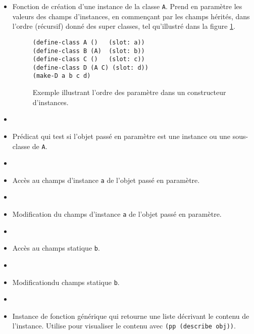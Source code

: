       \begin{itemize}
      \item[\texttt{(make-A a)}:] Fonction de création d'une instance
        de la classe \texttt{A}. Prend en paramètre les valeurs des
        champs d'instances, en commençant par les champs hérités, dans
        l'ordre (récursif) donné des super classes, tel qu'illustré
        dans la figure \ref{ex-make-instance}.
        \begin{figure}[h!]
          \begin{lstlisting}
(define-class A ()   (slot: a))
(define-class B (A)  (slot: b))
(define-class C ()   (slot: c))
(define-class D (A C) (slot: d))
(make-D a b c d)
          \end{lstlisting}
          \caption{Exemple illustrant l'ordre des paramètre dans un
            constructeur d'instances.}
          \label{ex-make-instance}
        \end{figure}
      \item[]

      \item[\texttt{(A? obj)}:] Prédicat qui test si l'objet passé en
        paramètre est une instance ou une sous-classe de \texttt{A}.
      \item[]

      \item[\texttt{(A-a obj)}:] Accès au champs d'instance \texttt{a}
        de l'objet passé en paramètre.
      \item[]

      \item[\texttt{(A-a-set! obj new-a)}:] Modification du champs
        d'instance \texttt{a} de l'objet passé en paramètre.
      \item[]

      \item[\texttt{(A-b)}:] Accès au champs statique \texttt{b}.
      \item[]

      \item[\texttt{(A-b-set! new-b)}:] Modificationdu champs
        statique \texttt{b}.
      \item[]

      \item[\texttt{(describe obj)}:] Instance de fonction générique
        qui retourne une liste décrivant le contenu de
        l'instance. Utilise pour visualiser le contenu avec
        \texttt{(pp (describe obj))}.
      \end{itemize}


